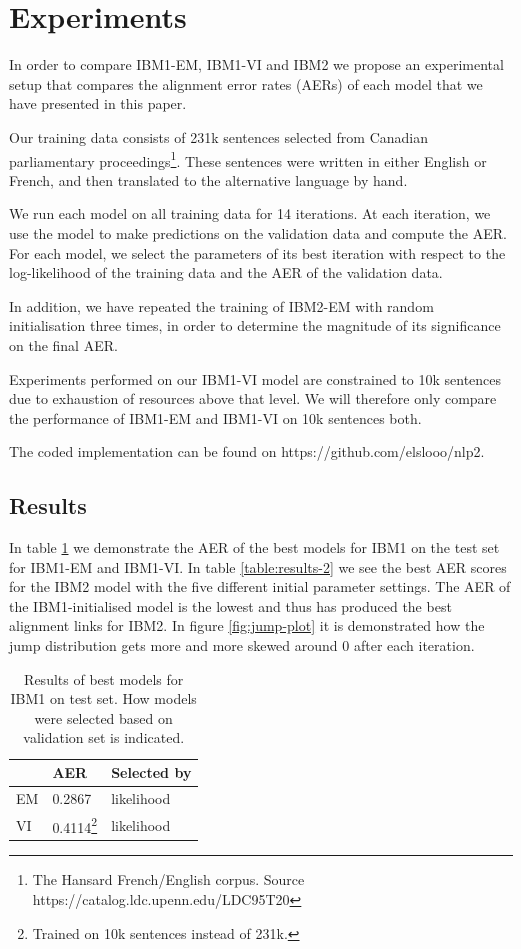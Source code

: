 \documentclass[11pt,a4paper]{article}
\begin{document}
\section{Experiments}

In order to compare IBM1-EM, IBM1-VI and IBM2 we propose an experimental setup that compares the alignment error rates (AERs) of each model that we have presented in this paper.

Our training data consists of 231k sentences selected from Canadian parliamentary proceedings\footnote{The Hansard French/English corpus. Source https://catalog.ldc.upenn.edu/LDC95T20}. These sentences were written in either English or French, and then translated to the alternative language by hand.

We run each model on all training data for 14 iterations. At each iteration, we use the model to make predictions on the validation data and compute the AER. For each model, we select the parameters of its best iteration with respect to the log-likelihood of the training data and the AER of the validation data.

In addition, we have repeated the training of IBM2-EM with random initialisation three times, in order to determine the magnitude of its significance on the final AER.

Experiments performed on our IBM1-VI model are constrained to 10k sentences due to exhaustion of resources above that level. We will therefore only compare the performance of IBM1-EM and IBM1-VI on 10k sentences both.

The coded implementation can be found on https://github.com/elslooo/nlp2.

\subsection{Results}
In table \ref{table:results-1} we demonstrate the AER of the best models for IBM1 on the test set for IBM1-EM and IBM1-VI.
In table \ref{table:results-2} we see the best AER scores for the IBM2 model with the five different initial parameter settings. The AER of the IBM1-initialised model is the lowest and thus has produced the best alignment links for IBM2.
In figure \ref{fig:jump-plot} it is demonstrated how the jump distribution gets more and more skewed around 0 after each iteration.
\begin{savenotes}
\begin{table}
\begin{tabular}{ |p{2cm}||p{2cm}||p{2cm}| }

 \hline
    & AER & Selected by\\
 \hline
 EM    &  0.2867 & likelihood \\
 VI   &  0.4114\protect\footnote{Trained on 10k sentences instead of 231k.}   & likelihood \\
 \hline
\end{tabular}
\caption{Results of best models for IBM1 on test set. How models were selected based on validation set is indicated.}
\label{table:results-1}
\end{table}
\end{savenotes}
\end{document}
